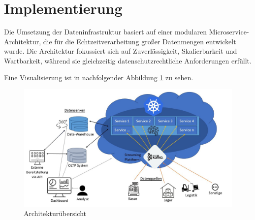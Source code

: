 \documentclass[%
pdftex,
oneside,			%
11pt,				%
parskip=half,		%
headheight = 12pt,	%
headsepline,		%
footsepline,		%
footheight = 16pt,	%
abstracton,		%
DIV=calc,		%
BCOR=8mm,		%
headinclude=false,	%
footinclude=false,	%
listof=totoc,		%
toc=bibliography,	%
]{scrreprt}	%
\newcommand{\comment}[1]{\par {\bfseries \color{blue} #1 \par}} %
\begin{document}
\newpage






\section{Implementierung}

    Die Umsetzung der Dateninfrastruktur basiert auf einer modularen Microservice-Architektur, die für die Echtzeitverarbeitung großer Datenmengen entwickelt wurde.
    Die Architektur fokussiert sich auf Zuverlässigkeit, Skalierbarkeit und Wartbarkeit, während sie gleichzeitig datenschutzrechtliche Anforderungen erfüllt.

    Eine Visualisierung ist in nachfolgender Abbildung \ref{fig:architekturentwurf} zu sehen.

    \begin{figure}[H]
        \centering
        \includegraphics[width=1\textwidth]{assets/architekturentwurf.jpg}
        \caption{Architekturübersicht}
        \label{fig:architekturentwurf}
    \end{figure}
\end{document}
